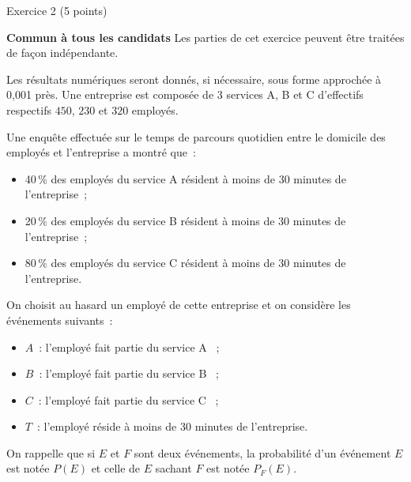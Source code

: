 
\begin{h2}Exercice 2 (5 points)\end{h2}
\textbf{Commun à  tous les candidats}
\medbreak
Les parties de cet exercice peuvent être traitées de façon indépendante.
\par
Les résultats numériques seront donnés, si nécessaire, sous forme approchée à 0,001 près.
Une entreprise est composée de 3 services A, B et C d'effectifs respectifs $450$, $230$ et $320$ employés.
\par
Une enquête effectuée sur le temps de parcours quotidien entre le domicile des employés et
l'entreprise a montré que~:
\begin{itemize}
     \item 40\,\% des employés du service A résident à moins de 30 minutes de l'entreprise~;
     \item 20\,\% des employés du service B résident à moins de 30 minutes de l'entreprise~;
     \item 80\,\% des employés du service C résident à moins de 30 minutes de l'entreprise.
\end{itemize}
On choisit au hasard un employé de cette entreprise et on considère les événements suivants~:
    \begin{itemize}
          \item $A$~: \og l'employé fait partie du service A \fg{}~;
          \item $B$~: \og l'employé fait partie du service B \fg{}~;
          \item $C$~: \og l'employé fait partie du service C \fg{}~;
          \item $T$~: \og l'employé réside à moins de 30 minutes de l'entreprise\fg.
     \end{itemize}
           On rappelle que si $E$ et $F$ sont deux événements, la probabilité d'un événement $E$ est notée $P(E)$ et celle de $E$ sachant $F$ est notée $P_F(E)$.
          \medbreak
